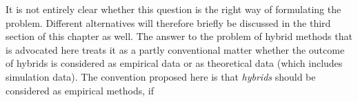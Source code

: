 \documentclass[12pt, a4paper]{article}
\numberwithin{equation}{section}
\begin{document}
It is not entirely clear whether this question is the right way of formulating the problem. Different alternatives will therefore briefly be discussed in the third section of this chapter as well.
The answer to the problem of hybrid methods that is advocated here treats it as a partly conventional matter whether the outcome of hybrids is considered as empirical data or as theoretical data (which includes simulation data). The convention proposed here is that {\em hybrids} should be considered as empirical methods, if 
\end{document}
